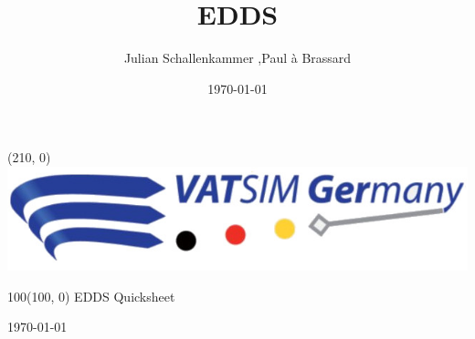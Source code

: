 \documentclass[10pt,landscape,a4paper]{article}
\title{EDDS}
\author{Julian Schallenkammer ,Paul à Brassard}
\date{\today}
\begin{document}
\setlength\extrarowheight{1pt}

\setlength{\TPHorizModule}{1mm}
\setlength{\TPVertModule}{\TPHorizModule}
\textblockorigin{7mm}{12mm}

\begin{textblock}{2}(210, 0)
  \includegraphics[width=30\textwidth]{VATGer-Logo-Colour}
\end{textblock}


\begin{textblock}{100}(100, 0)
  \large
  \centering
  EDDS Quicksheet

  \today
\end{textblock}
\end{document}
